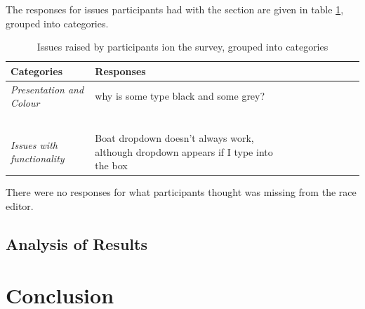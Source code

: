 \documentclass{l4proj}
\begin{document}
The responses for issues participants had with the section are given in table \ref{tab:table 1}, grouped into categories.

\begin{table}[!ht]
    \centering
    \caption{Issues raised by participants ion the survey, grouped into categories}
    \begin{tabular}{|l|l|l|l|l|l|l|l|l|l|}
    \hline
        \textbf{Categories} & \textbf{Responses}  \\ \hline
        \textit{Presentation and Colour} & why is some type black and some grey?  \\ \hline
        ~ & ~ \\ \hline
        \textit{Issues with functionality} & Boat dropdown doesn't always work, although dropdown appears if I type into the box  \\ \hline
    \end{tabular}
    \label{tab:table 1}
\end{table}

There were no responses for what participants thought was missing from the race editor.


\section{Analysis of Results}





\chapter{Conclusion}    


%
% 
\end{document}

